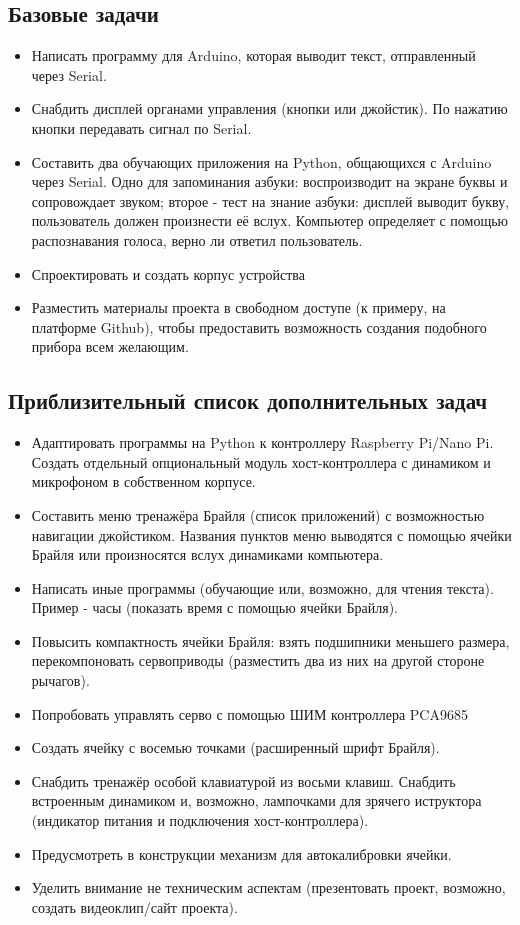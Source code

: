 \documentclass[a4paper,12pt]{article} %
\begin{document}
\subsection{Базовые задачи}
\begin{itemize}
\item{}Написать программу для Arduino, которая выводит текст, отправленный через Serial.
\item{}Снабдить дисплей органами управления (кнопки или джойстик). По нажатию кнопки передавать сигнал по Serial.
\item{}Составить два обучающих приложения на Python, общающихся с Arduino через Serial. Одно для запоминания азбуки: воспроизводит на экране буквы и сопровождает звуком; второе - тест на знание азбуки: дисплей выводит букву, пользователь должен произнести её вслух. Компьютер определяет с помощью распознавания голоса, верно ли ответил пользователь.
\item{}Спроектировать и создать корпус устройства
\item{}Разместить материалы проекта в свободном доступе (к примеру, на платформе Github), чтобы предоставить возможность создания подобного прибора всем желающим.
\end{itemize}
\subsection{Приблизительный список дополнительных задач}
\begin{itemize}
\item{}Адаптировать программы на Python к контроллеру Raspberry Pi/Nano Pi. Создать отдельный опциональный модуль хост-контроллера с динамиком и микрофоном в собственном корпусе.
\item{}Составить меню тренажёра Брайля (список приложений) с возможностью навигации джойстиком. Названия пунктов меню выводятся с помощью ячейки Брайля или произносятся вслух динамиками компьютера.
\item{}Написать иные программы (обучающие или, возможно, для чтения текста). Пример - часы (показать время с помощью ячейки Брайля).
\item{}Повысить компактность ячейки Брайля: взять подшипники меньшего размера, перекомпоновать сервоприводы (разместить два из них на другой стороне рычагов).
\item{}Попробовать управлять серво с помощью ШИМ контроллера PCA9685
\item{}Создать ячейку с восемью точками (расширенный шрифт Брайля).
\item{}Снабдить тренажёр особой клавиатурой из восьми клавиш. Снабдить встроенным динамиком и, возможно, лампочками для зрячего иструктора (индикатор питания и подключения хост-контроллера).
\item{}Предусмотреть в конструкции механизм для автокалибровки ячейки.
\item{}Уделить внимание не техническим аспектам (презентовать проект, возможно, создать видеоклип/сайт проекта).
\end{itemize}
\end{document}
